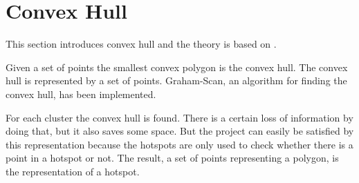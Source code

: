 \section{Convex Hull}\label{convex_hull}
This section introduces convex hull and the theory is based on \citet[section 33.3]{aadbook}.

Given a set of points the smallest convex polygon\cite[33.1-5]{aadbook} is the convex hull.
The convex hull is represented by a set of points.
Graham-Scan\cite[page 1031]{aadbook}, an algorithm for finding the convex hull, has been implemented.


For each cluster the convex hull is found.
There is a certain loss of information by doing that, but it also saves some space.
But the project can easily be satisfied by this representation because the hotspots are only used to check whether there is a point in a hotspot or not.
The result, a set of points representing a polygon, is the representation of a hotspot.
